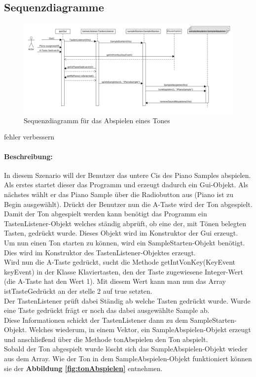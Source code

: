 \newpage

\subsection{Sequenzdiagramme}


\begin{figure}[h]
 \centering
 \includegraphics[width=1\textwidth]{./Bilder/Klaviertaste_Gedrueckt.png}
 \caption{Sequenzdiagramm für das Abspielen eines Tones}
\end{figure}

fehler verbessern

\paragraph{Beschreibung:} In diesem Szenario will der Benutzer das untere Cis des Piano Samples 
abspielen. Als erstes startet dieser das Programm und erzeugt dadurch ein Gui-Objekt. Als nächstes 
wählt er das Piano Sample über die Radiobutton aus (Piano ist zu Begin ausgewählt). Drückt der 
Benutzer nun die A-Taste wird der Ton abgespielt.\\
Damit der Ton abgespielt werden kann benötigt das Programm ein TastenListener-Objekt welches 
ständig abprüft, ob eine der, mit Tönen belegten Tasten, gedrückt wurde. Dieses Objekt wird im 
Konstruktor der Gui erzeugt.\\
Um nun einen Ton starten zu können, wird ein SampleStarten-Objekt benötigt. Dies wird im 
Konstruktor des TastenListener-Objektes erzeugt.\\
Wird nun die A-Taste gedrückt, sucht die Methode getIntVonKey(KeyEvent keyEvent) in der Klasse 
Klaviertasten, den der Taste zugewiesene Integer-Wert (die A-Taste hat den Wert 1). Mit diesem Wert 
kann man nun das Array istTasteGedrückt an der stelle 2 auf true setzten.\\
Der TastenListener prüft dabei Ständig ab welche Tasten gedrückt wurde. Wurde eine Taste gedrückt 
frägt er noch das dabei ausgewählte Sample ab.\\
Diese Informationen schickt der TastenListener dann zu dem SampleStarten-Objekt. Welches 
wiederum, in einem Vektor, ein SampleAbspielen-Objekt erzeugt und anschließend über die Methode 
tonAbspielen den Ton abspielt.\\
Sobald der Ton abgespielt wurde löscht sich das SampleAbspielen-Objekt wieder aus dem Array.
Wie der Ton in dem SampleAbspielen-Objekt funktioniert können sie der \textbf{Abbildung 
\ref{fig:tonAbspielen}} entnehmen.


